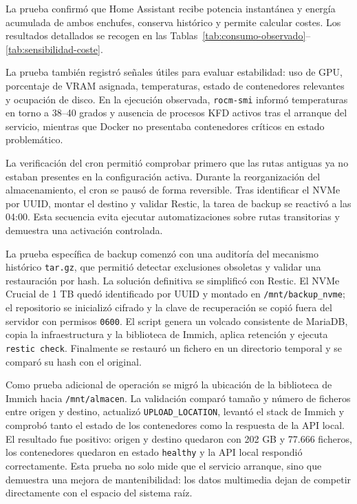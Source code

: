 La prueba confirmó que Home Assistant recibe potencia instantánea y energía acumulada de ambos enchufes, conserva histórico y permite calcular costes. Los resultados detallados se recogen en las Tablas~\ref{tab:consumo-observado}--\ref{tab:sensibilidad-coste}.

La prueba también registró señales útiles para evaluar estabilidad: uso de GPU, porcentaje de VRAM asignada, temperaturas, estado de contenedores relevantes y ocupación de disco. En la ejecución observada, \texttt{rocm-smi} informó temperaturas en torno a 38--40 grados y ausencia de procesos KFD activos tras el arranque del servicio, mientras que Docker no presentaba contenedores críticos en estado problemático.

La verificación del cron permitió comprobar primero que las rutas antiguas ya no estaban presentes en la configuración activa. Durante la reorganización del almacenamiento, el cron se pausó de forma reversible. Tras identificar el NVMe por UUID, montar el destino y validar Restic, la tarea de backup se reactivó a las 04:00. Esta secuencia evita ejecutar automatizaciones sobre rutas transitorias y demuestra una activación controlada.

La prueba específica de backup comenzó con una auditoría del mecanismo histórico \texttt{tar.gz}, que permitió detectar exclusiones obsoletas y validar una restauración por hash. La solución definitiva se simplificó con Restic. El NVMe Crucial de 1 TB quedó identificado por UUID y montado en \texttt{/mnt/backup\_nvme}; el repositorio se inicializó cifrado y la clave de recuperación se copió fuera del servidor con permisos \texttt{0600}. El script genera un volcado consistente de MariaDB, copia la infraestructura y la biblioteca de Immich, aplica retención y ejecuta \texttt{restic check}. Finalmente se restauró un fichero en un directorio temporal y se comparó su hash con el original.

Como prueba adicional de operación se migró la ubicación de la biblioteca de Immich hacia \texttt{/mnt/almacen}. La validación comparó tamaño y número de ficheros entre origen y destino, actualizó \texttt{UPLOAD\_LOCATION}, levantó el stack de Immich y comprobó tanto el estado de los contenedores como la respuesta de la API local. El resultado fue positivo: origen y destino quedaron con 202 GB y 77.666 ficheros, los contenedores quedaron en estado \texttt{healthy} y la API local respondió correctamente. Esta prueba no solo mide que el servicio arranque, sino que demuestra una mejora de mantenibilidad: los datos multimedia dejan de competir directamente con el espacio del sistema raíz.

